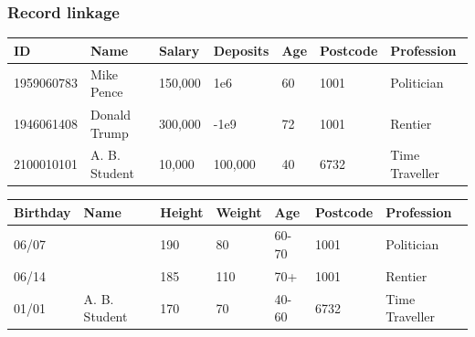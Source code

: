 \begin{frame}
  \frametitle{Record linkage}


    
  \begin{example}
    \begin{table}[H]
    \begin{tabular}{l|l|l|l|l|l|l}
      ID & Name &  Salary & Deposits & Age & Postcode & Profession\\
      \hline
      1959060783 & Mike Pence & 150,000 & 1e6 & 60 & 1001 & Politician\\
      1946061408 & Donald Trump & 300,000 & -1e9 & 72 & 1001 & Rentier\\
      2100010101 & A. B. Student & 10,000 & 100,000 & 40 & 6732 & Time Traveller
    \end{tabular}
  \end{table}
  \end{example}
  
  \begin{example}
    \begin{table}[H]
    \begin{tabular}{l|l|l|l|l|l|l}
      Birthday & Name & Height  & Weight & Age & Postcode & Profession\\
      \hline
      06/07 & & 190 & 80 & 60-70 & 1001 & Politician\\
      06/14 &  & 185 & 110 & 70+ & 1001 & Rentier\\
      01/01 & A. B. Student & 170 & 70 & 40-60 & 6732 & Time Traveller
    \end{tabular}
  \end{table}
  \end{example}
\end{frame}



